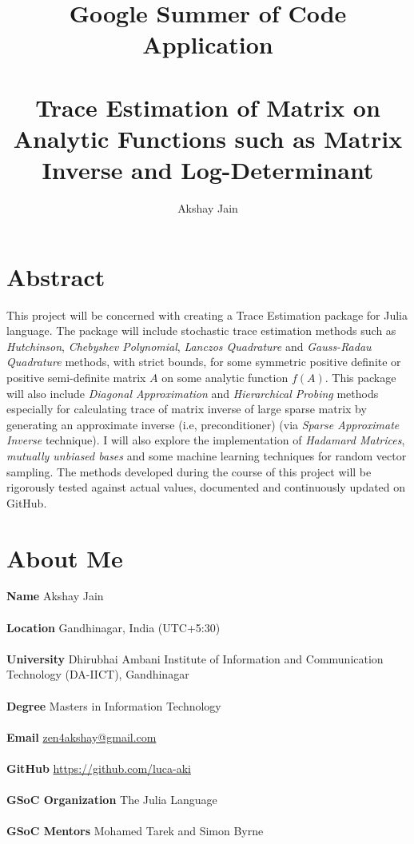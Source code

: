 \documentclass[12]{article}
\begin{document}
\begin{titlepage}
\title{
	\textbf{Google Summer of Code Application}\\~\\
	Trace Estimation of Matrix on Analytic Functions such as Matrix Inverse and Log-Determinant
}	

\author{Akshay Jain}
\date{}
\maketitle
\tableofcontents
\end{titlepage}

\section{Abstract}

This project will be concerned with creating a Trace Estimation package for Julia language. The package will include stochastic trace estimation methods such as \textit{Hutchinson}, \textit{Chebyshev Polynomial}, \textit{Lanczos Quadrature} and \textit{Gauss-Radau Quadrature} methods, with strict bounds, for some symmetric positive definite or positive semi-definite matrix $A$ on some analytic function $f(A)$. This package will also include \textit{Diagonal Approximation} and \textit{Hierarchical Probing} methods especially for calculating trace of matrix inverse of large sparse matrix by generating an approximate inverse (i.e, preconditioner) (via \textit{Sparse Approximate Inverse} technique). I will also explore the implementation of \textit{Hadamard Matrices}, \textit{mutually unbiased bases} and some machine learning techniques for random vector sampling. The methods developed during the course of this project will be rigorously tested against actual values, documented and continuously updated on GitHub.

\section{About Me}
\bigskip
\textbf{Name} Akshay Jain\\~\\
\textbf{Location} Gandhinagar, India (UTC+5:30)\\~\\    
\textbf{University} Dhirubhai Ambani Institute of Information and Communication Technology (DA-IICT), Gandhinagar\\~\\
\textbf{Degree} Masters in Information Technology\\~\\
\textbf{Email} \href{mailto:zen4akshay@gmail.com}{zen4akshay@gmail.com}\\~\\
\textbf{GitHub} \url{https://github.com/luca-aki}\\~\\
\textbf{GSoC Organization} The Julia Language\\~\\
\textbf{GSoC Mentors} Mohamed Tarek and Simon Byrne\\
\end{document}
